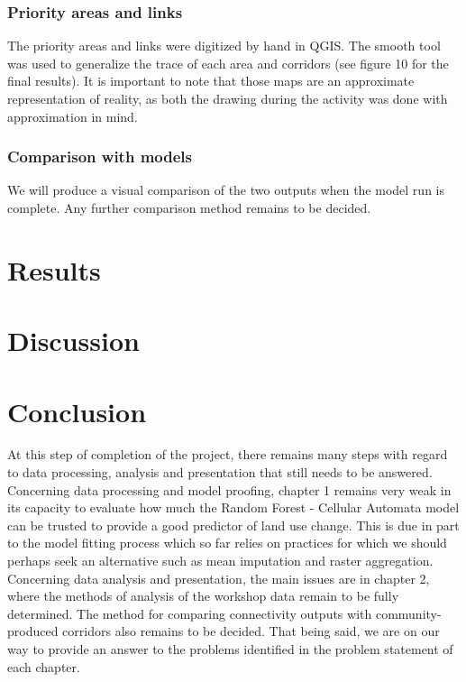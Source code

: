 \subsubsection*{Priority areas and links}

The priority areas and links were digitized by hand in QGIS. The smooth tool was used to generalize the trace of each area and corridors (see figure 10 for the final results). It is important to note that those maps  are an approximate representation of reality, as both the drawing during the activity was done with approximation in mind.\\

\subsubsection{Comparison with models}

We will produce a visual comparison of the two outputs when the model run is complete. Any further comparison method remains to be decided.\\

\section{Results}

\section{Discussion}

\section{Conclusion}

At this step of completion of the project, there remains many steps with regard to data processing, analysis and presentation that still needs to be answered. Concerning data processing and model proofing, chapter 1 remains very weak in its capacity to evaluate how much the Random Forest - Cellular Automata model can be trusted to provide a good predictor of land use change. This is due in part to the model fitting process which so far relies on practices for which we should perhaps seek an alternative such as mean imputation and raster aggregation. Concerning data analysis and presentation, the main issues are in chapter 2, where the methods of analysis of the workshop data remain to be fully determined. The method for comparing  connectivity outputs with community-produced corridors also remains to be decided. That being said, we are on our way to provide an answer to the problems identified in the problem statement of each chapter.\\


